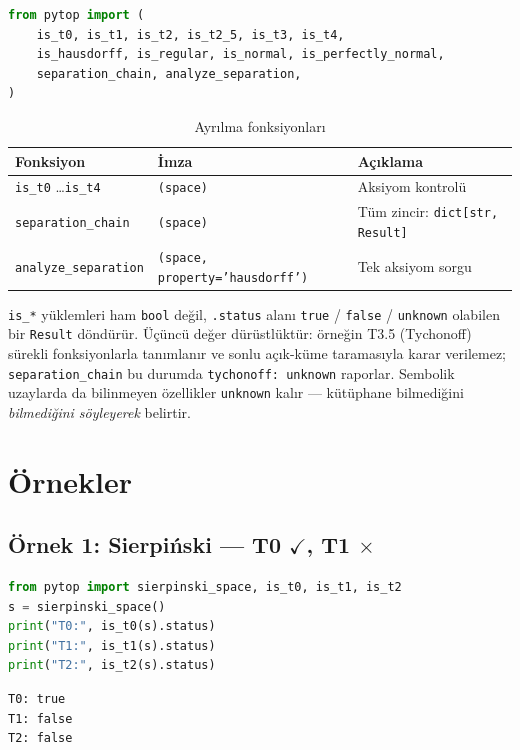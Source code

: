 \begin{lstlisting}[language=Python, caption={Ayrılma aksiyom importları}]
from pytop import (
    is_t0, is_t1, is_t2, is_t2_5, is_t3, is_t4,
    is_hausdorff, is_regular, is_normal, is_perfectly_normal,
    separation_chain, analyze_separation,
)
\end{lstlisting}

\begin{table}[h]
\centering
\begin{tabular}{lll}
\toprule
\textbf{Fonksiyon} & \textbf{İmza} & \textbf{Açıklama} \\
\midrule
\texttt{is\_t0} \ldots \texttt{is\_t4} & \texttt{(space)} & Aksiyom kontrolü \\
\texttt{separation\_chain} & \texttt{(space)} & Tüm zincir: \texttt{dict[str, Result]} \\
\texttt{analyze\_separation} & \texttt{(space, property='hausdorff')} & Tek aksiyom sorgu \\
\bottomrule
\end{tabular}
\caption{Ayrılma fonksiyonları}
\end{table}

\begin{nedenonemli}
\texttt{is\_*} yüklemleri ham \texttt{bool} değil, \texttt{.status}
alanı \texttt{true} / \texttt{false} / \texttt{unknown} olabilen bir
\texttt{Result} döndürür. Üçüncü değer dürüstlüktür: örneğin T3.5
(Tychonoff) sürekli fonksiyonlarla tanımlanır ve sonlu açık-küme
taramasıyla karar verilemez; \texttt{separation\_chain} bu durumda
\texttt{tychonoff: unknown} raporlar. Sembolik uzaylarda da
bilinmeyen özellikler \texttt{unknown} kalır --- kütüphane bilmediğini
\emph{bilmediğini söyleyerek} belirtir.
\end{nedenonemli}

\section{Örnekler}

\subsection{Örnek 1: Sierpiński — T0 $\checkmark$, T1 $\times$}

\begin{lstlisting}[language=Python]
from pytop import sierpinski_space, is_t0, is_t1, is_t2
s = sierpinski_space()
print("T0:", is_t0(s).status)
print("T1:", is_t1(s).status)
print("T2:", is_t2(s).status)
\end{lstlisting}
\begin{lstlisting}[caption={Çıktı}]
T0: true
T1: false
T2: false
\end{lstlisting}

